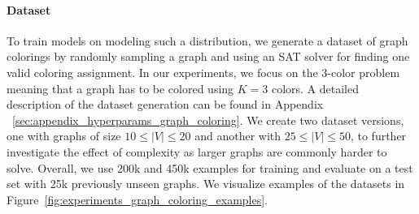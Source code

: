\paragraph{Dataset} To train models on modeling such a distribution, we generate a dataset of graph colorings by randomly sampling a graph and using an SAT solver 
for finding one valid coloring assignment. In our experiments, we focus on the 3-color problem meaning that a graph has to be colored using $K=3$ colors. A detailed description of the dataset generation can be found in Appendix
~\ref{sec:appendix_hyperparams_graph_coloring}. We create two dataset versions, one with graphs of size $10\leq|V|\leq20$ and another with $25\leq|V|\leq50$, to further investigate the effect of complexity as larger graphs are commonly harder to solve. Overall, we use 200k and 450k examples for training and evaluate on a test set with 25k previously unseen graphs. We visualize examples of the datasets in Figure~\ref{fig:experiments_graph_coloring_examples}.

